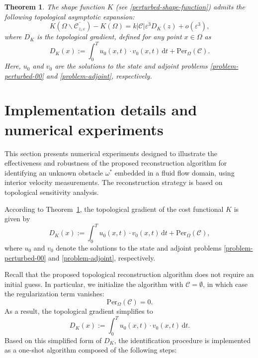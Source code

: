 \documentclass[a4paper,12pt,reqno,natbib]{amsart}
\newtheorem{theorem}{Theorem}
\newcommand{\dt} {\displaystyle\mathrm{d}t}
\begin{document}
\begin{theorem}\label{TD-G}
    The shape function \( K \)  (see \eqref{perturbed-shape-function}) admits the following topological asymptotic expansion:
    \begin{equation*}
        K(\Omega\backslash\overline{\mathcal{C}_{z,\varepsilon}}) - K(\Omega) 
        = k |\mathcal{C}| \varepsilon^3 D_K(z) + o(\varepsilon^3),
    \end{equation*}
    where \( D_K \) is the topological gradient, defined for any point \( x \in \Omega \) as
    $$
        D_K(x) := \int_0^T u_0(x,t) \cdot v_0(x,t) \,\dt + \text{Per}_\Omega(\mathcal{C}).
    $$
Here, \( u_0 \) and \( v_0 \) are the solutions to the state and adjoint problems \eqref{problem-perturbed-00} and \eqref{problem-adjoint}, respectively.
\end{theorem}


\section{Implementation details and numerical experiments}\label{one-iter-alghorithm} 

This section presents numerical experiments designed to illustrate the effectiveness and robustness of the proposed reconstruction algorithm for identifying an unknown obstacle \( \omega^* \) embedded in a fluid flow domain, using interior velocity measurements. The reconstruction strategy is based on topological sensitivity analysis.


According to Theorem~\ref{TD-G}, the topological gradient of the cost functional \( K \) is given by
\[
D_K(x) := \int_0^T u_0(x,t) \cdot v_0(x,t) \, \dt + \text{Per}_\Omega(\mathcal{C}),
\]
where \( u_0 \) and \( v_0 \) denote the solutions to the state and adjoint problems \eqref{problem-perturbed-00} and \eqref{problem-adjoint}, respectively.

Recall that the proposed topological reconstruction algorithm does not require an initial guess. In particular, we initialize the algorithm with \( \mathcal{C} = \emptyset \), in which case the regularization term vanishes:
\[
\text{Per}_\Omega(\mathcal{C}) = 0.
\]
As a result, the topological gradient simplifies to
\begin{equation}\label{gradient-final}
    D_K(x) := \int_0^T u_0(x,t) \cdot v_0(x,t) \, \dt.
\end{equation}
Based on this simplified form of \( D_K \), the identification procedure is implemented as a one-shot algorithm composed of the following steps:
\end{document}

